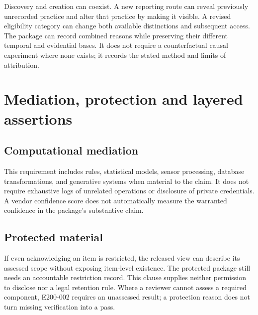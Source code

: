 \documentclass[11pt,a4paper]{article}
\begin{document}
Discovery and creation can coexist. A new reporting route can reveal previously unrecorded practice and alter that practice by making it visible. A revised eligibility category can change both available distinctions and subsequent access. The package can record combined reasons while preserving their different temporal and evidential bases. It does not require a counterfactual causal experiment where none exists; it records the stated method and limits of attribution.
\section{Mediation, protection and layered assertions}

\subsection{Computational mediation}

This requirement includes rules, statistical models, sensor processing, database transformations, and generative systems when material to the claim. It does not require exhaustive logs of unrelated operations or disclosure of private credentials. A vendor confidence score does not automatically measure the warranted confidence in the package's substantive claim.

\subsection{Protected material}

If even acknowledging an item is restricted, the released view can describe its assessed scope without exposing item-level existence. The protected package still needs an accountable restriction record. This clause supplies neither permission to disclose nor a legal retention rule. Where a reviewer cannot assess a required component, E200-002 requires an unassessed result; a protection reason does not turn missing verification into a pass.
\end{document}
